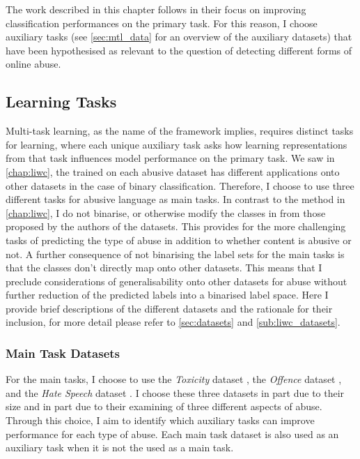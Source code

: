 The work described in this chapter follows \citet{Rajamanickam:2020} in their focus on improving classification performances on the primary task.
For this reason, I choose auxiliary tasks (see \cref{sec:mtl_data} for an overview of the auxiliary datasets) that have been hypothesised as relevant to the question of detecting different forms of online abuse.

\subsection{Learning Tasks}\label{sec:mtl_tasks}

Multi-task learning, as the name of the framework implies, requires distinct tasks for learning, where each unique auxiliary task asks how learning representations from that task influences model performance on the primary task.
We saw in \cref{chap:liwc}, the trained on each abusive dataset has different applications onto other datasets in the case of binary classification. Therefore, I choose to use three different tasks for abusive language as main tasks.
In contrast to the method in \cref{chap:liwc}, I do not binarise, or otherwise modify the classes in from those proposed by the authors of the datasets.
This provides for the more challenging tasks of predicting the type of abuse in addition to whether content is abusive or not.
A further consequence of not binarising the label sets for the main tasks is that the classes don't directly map onto other datasets.
This means that I preclude considerations of generalisability onto other datasets for abuse without further reduction of the predicted labels into a binarised label space.
Here I provide brief descriptions of the different datasets and the rationale for their inclusion, for more detail please refer to \cref{sec:datasets} and \cref{sub:liwc_datasets}.

\subsubsection{Main Task Datasets}
For the main tasks, I choose to use the \textit{Toxicity} dataset \citep{Wulczyn:2017}, the \textit{Offence} dataset \citep{Davidson:2017}, and the \textit{Hate Speech} dataset \citep{Waseem-Hovy:2016}. I choose these three datasets in part due to their size and in part due to their examining of three different aspects of abuse.
Through this choice, I aim to identify which auxiliary tasks can improve performance for each type of abuse.
Each main task dataset is also used as an auxiliary task when it is not the used as a main task.

